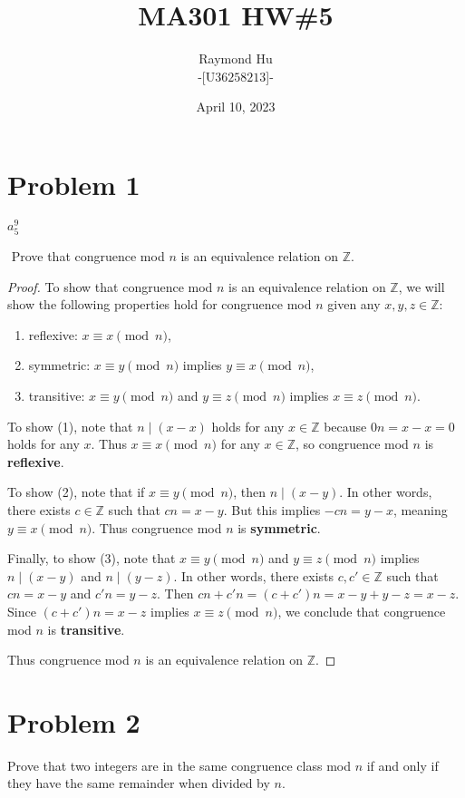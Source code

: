 \documentclass[12pt]{article}
\title{MA301 HW\#5}
\author{Raymond Hu\\[1ex]\normalsize-[U\(36258213\)]-}
\date{April 10, 2023}
\newcommand{\Z}{\mathbb{Z}}
\theoremstyle{definition}
\begin{document}
\maketitle

\doublespacing

\section*{Problem 1}
\(a_5 ^9 \)

\(\)
Prove that congruence mod \(n\) is an equivalence relation on \(\Z\).
\begin{proof}
    To show that congruence mod \(n\) is an equivalence relation on \(\Z\), we will show the following properties hold for congruence mod \(n\) given any \(x,y,z\in\Z\):
    \begin{enumerate}[label = (\arabic*)]
        \item reflexive: \(x\equiv x\pmod{n}\),
        \item symmetric: \(x\equiv y\pmod{n}\) implies \(y\equiv x\pmod{n}\),
        \item transitive: \(x\equiv y\pmod{n}\) and \(y\equiv z\pmod{n}\) implies \(x\equiv z\pmod{n}\).
    \end{enumerate}
    To show (1), note that \(n\mid (x-x)\) holds for any \(x\in\Z\) because \(0n = x-x = 0\) holds for any \(x\). Thus \(x\equiv x\pmod{n}\) for any \(x\in\Z\), so congruence mod \(n\) is \textbf{reflexive}. 

    To show (2), note that if \(x\equiv y\pmod{n}\), then \(n\mid (x-y)\). In other words, there exists \(c\in\Z\) such that \(cn = x-y\). But this implies \(-cn = y-x\), meaning \(y\equiv x\pmod{n}\). Thus congruence mod \(n\) is \textbf{symmetric}.

    Finally, to show (3), note that \(x\equiv y\pmod{n}\) and \(y\equiv z\pmod{n}\) implies \(n\mid (x-y)\) and \(n\mid (y-z)\). In other words, there exists \(c, c'\in\Z\) such that \(cn = x-y\) and \(c'n = y-z\). Then \(cn + c'n = (c+c')n = x-y + y-z = x-z\). Since \((c+c')n = x-z\) implies \(x\equiv z\pmod{n}\), we conclude that congruence mod \(n\) is \textbf{transitive}.

    Thus congruence mod \(n\) is an equivalence relation on \(\Z\).
\end{proof}

\section*{Problem 2}
Prove that two integers are in the same congruence class mod \(n\) if and only if they have the same
remainder when divided by \(n\).
\end{document}
